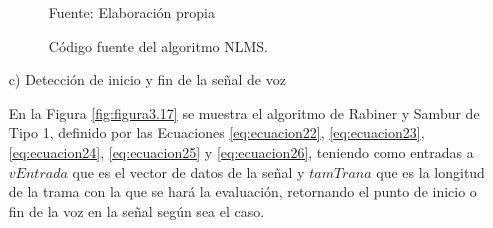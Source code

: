 \begin{enumerate}
\begin{figure}[H]
\begin{center}
\caption{\small{Código fuente del algoritmo NLMS.}}
\label{fig:figura3.8}
{\small{Fuente: Elaboración propia}}
\end{center}
\end{figure}
\vskip -0.5cm
\item[c)]Detección de inicio y fin de la señal de voz
\par
En la Figura \ref{fig:figura3.17} se muestra el algoritmo de Rabiner y Sambur de Tipo 1, definido por las Ecuaciones \eqref{eq:ecuacion22}, \eqref{eq:ecuacion23}, \eqref{eq:ecuacion24}, \eqref{eq:ecuacion25} y \eqref{eq:ecuacion26}, teniendo como entradas a $vEntrada$ que es el vector de datos de la señal y $tamTrana$ que es la longitud de la trama con la que se hará la evaluación, retornando el punto de inicio o fin de la voz en la señal según sea el caso.


\end{enumerate}
